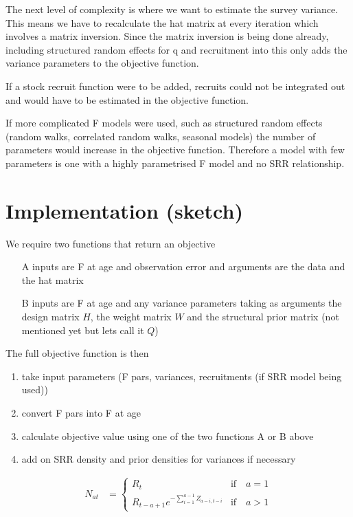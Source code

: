 \documentclass[a4paper,english]{article}
\begin{document}
The next level of complexity is where we want to estimate the survey variance.  This means we have to recalculate the hat matrix at every iteration which involves a matrix inversion.  Since the matrix inversion is being done already, including structured random effects for q and recruitment into this only adds the variance parameters to the objective function.

If a stock recruit function were to be added, recruits could not be integrated out and would have to be estimated in the objective function.

If more complicated F models were used, such as structured random effects (random walks, correlated random walks, seasonal models) the number of parameters would increase in the objective function.  Therefore a model with few parameters is one with a highly parametrised F model and no SRR relationship.

\section{Implementation (sketch)}

We require two functions that return an objective
\begin{enumerate}
  \item[A] inputs are F at age and observation error and arguments are the data and the hat matrix
  \item[B] inputs are F at age  and any variance parameters taking as arguments the design matrix $H$, the weight matrix $W$ and the structural prior matrix (not mentioned yet but lets call it $Q$)
\end{enumerate}

The full objective function is then
\begin{enumerate}
  \item take input parameters (F pars, variances, recruitments (if SRR model being used))
  \item convert F pars into F at age
  \item calculate objective value using one of the two functions A or B above
  \item add on SRR density and prior densities for variances if necessary
\end{enumerate}






\iffalse %


\begin{align}
  N_{at} &= 
  \left\lbrace 
    \begin{array}{ll}
      R_t & \text{if} \quad a = 1 \\
      R_{t-a+1} e^{ -\sum_{i=1}^{a-1} Z_{a-i,t-i}} & \text{if} \quad a > 1
    \end{array} \right.
\end{align}
\end{document}
